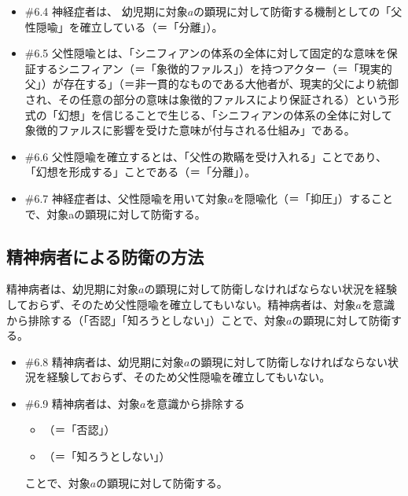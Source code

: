 \begin{note}{}
  \begin{itemize}
    \tightlist
    \item{\#6.4}
      神経症者は、  幼児期に対象$a$の顕現に対して防衛する機制としての「父性隠喩」を確立している（＝「分離」）。
    \item{\#6.5}
      父性隠喩とは、「シニフィアンの体系の全体に対して固定的な意味を保証するシニフィアン（＝「象徴的ファルス」）を持つアクター（＝「現実的父」）が存在する」（＝非一貫的なものである大他者が、現実的父により統御され、その任意の部分の意味は象徴的ファルスにより保証される）という形式の「幻想」を信じることで生じる、「シニフィアンの体系の全体に対して象徴的ファルスに影響を受けた意味が付与される仕組み」である。
    \item{\#6.6}
      父性隠喩を確立するとは、「父性の欺瞞を受け入れる」ことであり、「幻想を形成する」ことである（＝「分離」）。
    \item{\#6.7}
      神経症者は、父性隠喩を用いて対象$a$を隠喩化（＝「抑圧」）することで、対象aの顕現に対して防衛する。
  \end{itemize}
\end{note}

\subsection{精神病者による防衛の方法}\label{ux7cbeux795eux75c5ux8005ux306bux3088ux308bux9632ux885bux306eux65b9ux6cd5}

精神病者は、幼児期に対象\(a\)の顕現に対して防衛しなければならない状況を経験しておらず、そのため父性隠喩を確立してもいない。精神病者は、対象\(a\)を意識から排除する（「否認」「知ろうとしない」）ことで、対象\(a\)の顕現に対して防衛する。

\begin{note}{}
  \begin{itemize}
    \tightlist
    \item{\#6.8}
      精神病者は、幼児期に対象$a$の顕現に対して防衛しなければならない状況を経験しておらず、そのため父性隠喩を確立してもいない。
    \item{\#6.9}
      精神病者は、対象$a$を意識から排除する
      \begin{itemize}
          \tightlist
          \item
          （＝「否認」）
          \item
          （＝「知ろうとしない」）
        \end{itemize}
      ことで、対象$a$の顕現に対して防衛する。
  \end{itemize}
\end{note}

